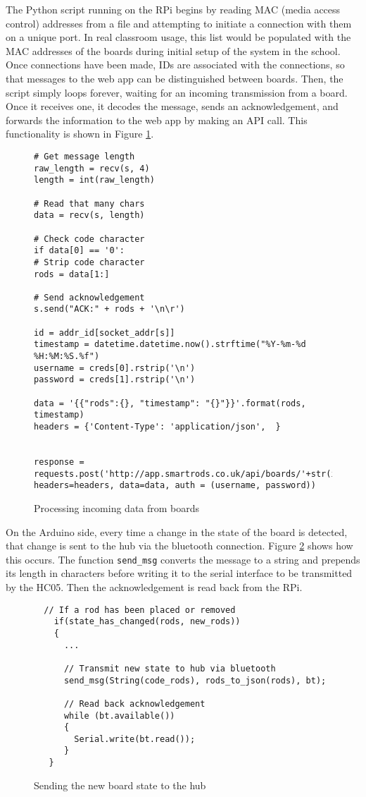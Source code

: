 The Python script running on the RPi begins by reading MAC (media access control) addresses from a file and attempting to initiate a connection with them on a unique port. In real classroom usage, this list would be populated with the MAC addresses of the boards during initial setup of the system in the school. Once connections have been made, IDs are associated with the connections, so that messages to the web app can be distinguished between boards. Then, the script simply loops forever, waiting for an incoming transmission from a board. Once it receives one, it decodes the message, sends an acknowledgement, and forwards the information to the web app by making an API call. This functionality is shown in Figure \ref{lst:process_state}.

\begin{figure}[H]
\centering
\begin{verbatim}
# Get message length
raw_length = recv(s, 4)
length = int(raw_length)

# Read that many chars
data = recv(s, length)

# Check code character
if data[0] == '0':
# Strip code character
rods = data[1:]

# Send acknowledgement
s.send("ACK:" + rods + '\n\r')

id = addr_id[socket_addr[s]]
timestamp = datetime.datetime.now().strftime("%Y-%m-%d %H:%M:%S.%f")
username = creds[0].rstrip('\n')
password = creds[1].rstrip('\n')

data = '{{"rods":{}, "timestamp": "{}"}}'.format(rods, timestamp)
headers = {'Content-Type': 'application/json',	}


response = requests.post('http://app.smartrods.co.uk/api/boards/'+str(id), headers=headers, data=data, auth = (username, password))

\end{verbatim}
\caption{Processing incoming data from boards}
\label{lst:process_state}
\end{figure}


On the Arduino side, every time a change in the state of the board is detected, that change is sent to the hub via the bluetooth connection. Figure \ref{lst:send_msg} shows how this occurs. The function \texttt{send\_msg} converts the message to a string and prepends its length in characters before writing it to the serial interface to be transmitted by the HC05. Then the acknowledgement is read back from the RPi.

\begin{figure}[H]
\centering
\begin{verbatim}
  // If a rod has been placed or removed
    if(state_has_changed(rods, new_rods))
    {
      ...

      // Transmit new state to hub via bluetooth
      send_msg(String(code_rods), rods_to_json(rods), bt);

      // Read back acknowledgement
      while (bt.available())
      {
        Serial.write(bt.read());
      }
   }
\end{verbatim}
\caption{Sending the new board state to the hub}
\label{lst:send_msg}
\end{figure}



    
    
    
    
    